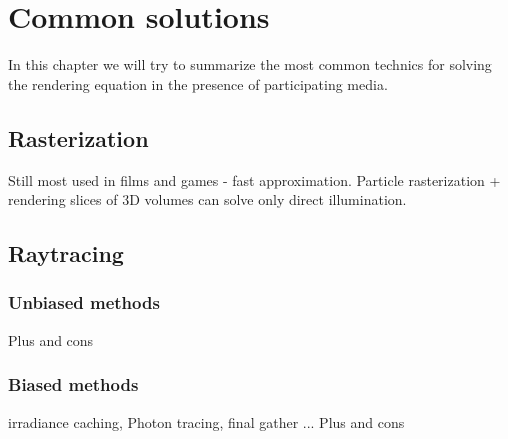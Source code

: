 \chapter{Common solutions}
In this chapter we will try to summarize the most common technics for solving the rendering equation in the presence of participating media.

\section{ Rasterization}
Still most used in films and games - fast approximation.
Particle rasterization + rendering slices of 3D volumes can solve only direct illumination.
\section{Raytracing}
\subsection{Unbiased methods}
Plus and cons
\subsection{Biased methods}
irradiance caching, Photon tracing, final gather ...
Plus and cons

